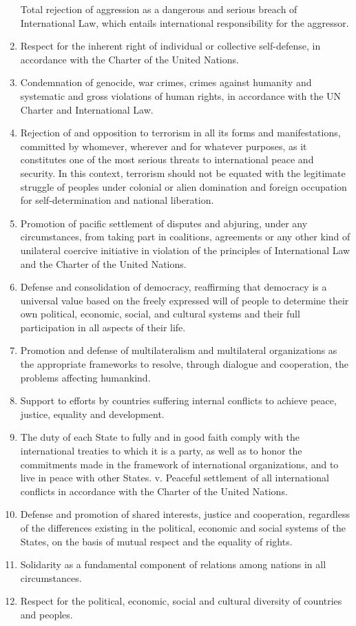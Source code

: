 \documentclass[
  openany]{book}
\begin{document}
\begin{enumerate}
  Total rejection of aggression as a dangerous and serious breach of International Law, which entails international responsibility for the aggressor.
\item
  Respect for the inherent right of individual or collective self-defense, in accordance with the Charter of the United Nations.
\item
  Condemnation of genocide, war crimes, crimes against humanity and systematic and gross violations of human rights, in accordance with the UN Charter and International Law.
\item
  Rejection of and opposition to terrorism in all its forms and manifestations, committed by whomever, wherever and for whatever purposes, as it constitutes one of the most serious threats to international peace and security. In this context, terrorism should not be equated with the legitimate struggle of peoples under colonial or alien domination and foreign occupation for self-determination and national liberation.
\item
  Promotion of pacific settlement of disputes and abjuring, under any circumstances, from taking part in coalitions, agreements or any other kind of unilateral coercive initiative in violation of the principles of International Law and the Charter of the United Nations.
\item
  Defense and consolidation of democracy, reaffirming that democracy is a universal value based on the freely expressed will of people to determine their own political, economic, social, and cultural systems and their full participation in all aspects of their life.
\item
  Promotion and defense of multilateralism and multilateral organizations as the appropriate frameworks to resolve, through dialogue and cooperation, the problems affecting humankind.
\item
  Support to efforts by countries suffering internal conflicts to achieve peace, justice, equality and development.
\item
  The duty of each State to fully and in good faith comply with the international treaties to which it is a party, as well as to honor the commitments made in the framework of international organizations, and to live in peace with other States. v. Peaceful settlement of all international conflicts in accordance with the Charter of the United Nations.
\item
  Defense and promotion of shared interests, justice and cooperation, regardless of the differences existing in the political, economic and social systems of the States, on the basis of mutual respect and the equality of rights.
\item
  Solidarity as a fundamental component of relations among nations in all circumstances.
\item
  Respect for the political, economic, social and cultural diversity of countries and peoples.
\end{enumerate}
\end{document}
